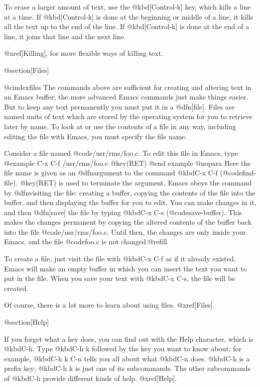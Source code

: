 {{{{  To erase a larger amount of text, use the @kbd[Control-k] key, which
kills a line at a time.  If @kbd[Control-k] is done at the beginning or
middle of a line, it kills all the text up to the end of the line.  If
@kbd[Control-k] is done at the end of a line, it joins that line and the
next line.

  @xref[Killing], for more flexible ways of killing text.

@section[Files]

@cindex{files}
  The commands above are sufficient for creating and altering text in an
Emacs buffer; the more advanced Emacs commands just make things easier.
But to keep any text permanently you must put it in a @dfn[file].  Files
are named units of text which are stored by the operating system for you to
retrieve later by name.  To look at or use the contents of a file in any
way, including editing the file with Emacs, you must specify the file name.

  Consider a file named @code{/usr/rms/foo.c}.  To edit this file in Emacs,
type
@example
C-x C-f /usr/rms/foo.c @key(RET)
@end example
@nopara
Here the file name is given as an @dfn{argument} to the command @kbd{C-x
C-f} (@code{find-file}).  @key(RET) is used to terminate the argument.
Emacs obeys the command by @dfn{visiting} the file: creating a buffer,
copying the contents of the file into the buffer, and then displaying the
buffer for you to edit.  You can make changes in it, and then @dfn[save]
the file by typing @kbd{C-x C-s} (@code{save-buffer}).  This makes the
changes permanent by copying the altered contents of the buffer back into
the file @code{/usr/rms/foo.c}.  Until then, the changes are only inside
your Emacs, and the file @code{foo.c} is not changed.@refill

  To create a file, just visit the file with @kbd{C-x C-f} as if it already
existed.  Emacs will make an empty buffer in which you can insert the text
you want to put in the file.  When you save your text with @kbd{C-x C-s},
the file will be created.

  Of course, there is a lot more to learn about using files.  @xref[Files].

@section[Help]

  If you forget what a key does, you can find out with the Help
character, which is @kbd{C-h}.  Type @kbd{C-h k} followed by the key
you want to know about; for example, @kbd{C-h k C-n} tells you all
about what @kbd{C-n} does.  @kbd{C-h} is a prefix key; @kbd{C-h k} is
just one of its subcommands.  The other subcommands of @kbd{C-h} provide
different kinds of help.  @xref[Help].

}}}}
